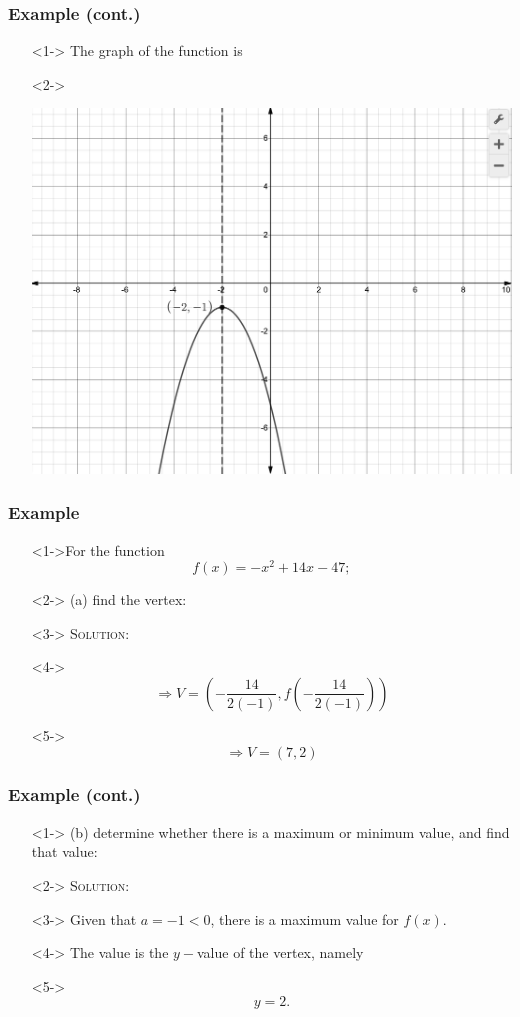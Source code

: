 \documentclass[handout]{beamer}
\begin{document}
\begin{frame}
	\frametitle{Example (cont.)} 
	\begin{enumerate}
		\item[]<1-> The graph of the function is 
		\item[]<2->\begin{center}
				\includegraphics[scale=0.25]{3_3_7.png} 		
			\end{center} 
	\end{enumerate}
\end{frame}

\begin{frame}
	\frametitle{Example} 
	\begin{enumerate}
		\item[]<1->For the function 
		\[
			f(x)=-x^{2}+14x-47;  
		\]
		\item[]<2-> (a) find the vertex: 
		\item[]<3-> \textsc{Solution:} 
		\item[]<4->\[ \Rightarrow V=\left(-\frac{14}{2(-1)}, f \left( -\frac{14}{2(-1)} \right)  \right) \]
		\item[]<5-> \[ \Rightarrow V= \left( 7, 2 \right) \] 
	\end{enumerate}
\end{frame}

\begin{frame}
	\frametitle{Example (cont.)} 
	\begin{enumerate}
		\item[]<1-> (b) determine whether there is a maximum or minimum value, and find that value: 
		\item[]<2-> \textsc{Solution:} 
		\item[]<3-> Given that $a=-1<0$, there is a maximum value for $f(x)$. 
		\item[]<4-> The value is the $y-$value of the vertex, namely 
		\item[]<5-> \[ y=2. \]
	\end{enumerate}
\end{frame}
\end{document}
